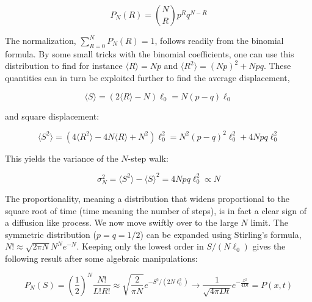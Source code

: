\documentclass[a4paper, 11pt, notitlepage,english]{article}
\begin{document}
\begin{equation}
P_N(R) = \binom{N}{R} p^R q^{N-R}
\label{eq:RW_Bernoulli}
\end{equation}

The normalization, $\sum_{R=0}^N P_N(R) = 1$, follows readily from the binomial formula. By some small tricks with the binomial coefficients, one can use this distribution to find for instance $\langle R \rangle = Np$ and $\langle R^2 \rangle = (Np)^2 + Npq$. These quantities can in turn be exploited further to find the average displacement, 

\begin{equation}
\langle S \rangle = (2 \langle R \rangle - N)\ell_0 = N(p-q)\ell_0
\label{eq:RW_displacement}
\end{equation}

and square displacement:

\begin{equation}
\langle S^2 \rangle = (4\langle R^2 \rangle -4N\langle R \rangle +  N^2)\ell_0^2 = N^2(p-q)^2\ell_0^2 + 4Npq\ell_0^2
\label{eq:RW_displacement_sq}
\end{equation}

This yields the variance of the $N$-step walk:

\begin{equation}
\sigma_N^2 = \langle S^2 \rangle - \langle S \rangle^2 = 4Npq\ell_0^2 \propto N
\label{eq:RW_variance}
\end{equation}

The proportionality, meaning a distribution that widens proportional to the square root of time (time meaning the number of steps), is in fact a clear sign of a diffusion like process. We now move swiftly over to the large $N$ limit. The symmetric distribution ($p=q=1/2$) can be expanded using Stirling's formula, $N! \approx \sqrt{2\pi N} N^N e^{-N}$. Keeping only the lowest order in $S/(N\ell_0)$ gives the following result after some algebraic manipulations:

\begin{equation}
P_N(S) = \left( \frac{1}{2} \right)^N \frac{N!}{L!R!} \approx \sqrt{\frac{2}{\pi N}} e^{-S^2/(2N\ell_0^2)} \to \frac{1}{\sqrt{4\pi D t}} e^{-\frac{x^2}{4Dt}} = P(x,t)
\label{eq:RW_symmetric_largeN}
\end{equation}
\end{document}
